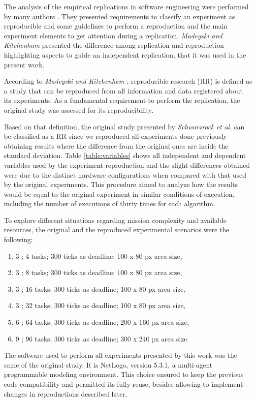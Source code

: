 The analysis of the empirical replications in software engineering were performed by many authors \cite{exp05, exp04, exp03, exp01}. They presented requirements to classify an experiment as reproducible and some guidelines to perform a reproduction and the main experiment elements to get attention during a replication. \textit{Madeyski and Kitchenham} \cite{exp02} presented the difference among replication and reproduction highlighting aspects to guide an independent replication, that it was used in the present work.

According to \textit{Madeyski and Kitchenham} \cite{exp02}, reproducible research (RR) is defined as a study that can be reproduced from all information and data registered about its experiments. As a fundamental requirement to perform the replication, the original study was assessed for its reproducibility.

Based on that definition, the original study presented by \textit{Schwarzrock et al.} \cite{MAS07} can be classified as a RR since we reproduced all experiments done previously obtaining results where the difference from the original ones are inside the standard deviation. Table \ref{table:variables} shows all independent and dependent variables used by the experiment reproduction and the slight differences obtained were due to the distinct hardware configurations when compared with that used by the original experiments. This procedure aimed to analyze how the results would be equal to the original experiment in similar conditions of execution, including the number of executions of thirty times for each algorithm.

To explore different situations regarding mission complexity and available resources, the original and the reproduced experimental scenarios were the following:

\begin{enumerate}
	\item 3 \uavs; 4 tasks; 300 ticks as deadline; 100 x 80 px area size, \label{case:4tasks}
	\item 3 \uavs; 8 tasks; 300 ticks as deadline; 100 x 80 px area size, \label{case:8tasks}
	\item 3 \uavs; 16 tasks; 300 ticks as deadline; 100 x 80 px area size, \label{case:16tasks}
	\item 3 \uavs; 32 tasks; 300 ticks as deadline; 100 x 80 px area size, \label{case:32tasks}
	\item 6 \uavs; 64 tasks; 300 ticks as deadline; 200 x 160 px area size, \label{case:64tasks}
	\item 9 \uavs; 96 tasks; 300 ticks as deadline; 300 x 240 px area size. \label{case:96tasks}
\end{enumerate}

The software used to perform all experiments presented by this work was the same of the original study\cite{MAS07}. It is NetLogo, version 5.3.1, a multi-agent programmable modeling environment. This choice ensured to keep the previous code compatibility and permitted its fully reuse, besides allowing to implement changes in reproductions described later.


